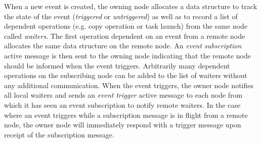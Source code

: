 When a new event is created, the owning node allocates a data structure to track the state of
the event ({\em triggered} or {\em untriggered}) as well as to record a list of dependent operations
(e.g. copy operation or task launch) from the same node called {\em waiters}.
The first operation dependent on an event
from a remote node allocates the same data structure on the remote node.  An
{\em event subscription} active message is then sent to the owning node indicating
that the remote node should be informed when the event triggers.  Arbitrarily many dependent operations on
the subscribing node can be added to the list of waiters without any additional communication.
When the event triggers, the owner node notifies all local waiters and
sends an {\em event trigger} active message to each node from which it has seen an event subscription
to notify remote waiters.
In the case where an event triggers while a subscription message is in flight from a remote node, the owner
node will immediately respond with a trigger message upon receipt of the subscription message.

